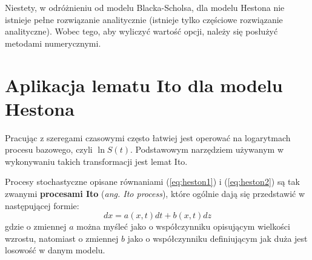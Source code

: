 \documentclass{pracamgr}
\begin{document}
Niestety, w odróżnieniu od modelu Blacka-Scholsa, dla modelu Hestona nie istnieje pełne rozwiązanie 
analitycznie (istnieje tylko częściowe rozwiązanie analityczne). Wobec tego, aby 
wyliczyć wartość opcji, należy się posłużyć metodami numerycznymi.

\section{Aplikacja lematu Ito dla modelu Hestona}

Pracując z szeregami czasowymi często łatwiej jest operować na 
logarytmach procesu bazowego, czyli $\ln S(t)$.
Podstawowym narzędziem używanym w wykonywaniu takich transformacji jest lemat Ito.

Procesy stochastyczne opisane równaniami (\ref{eq:heston1}) i (\ref{eq:heston2}) są tak 
zwanymi \textbf{procesami Ito}
(\textit{ang. Ito process}), które ogólnie dają się przedstawić w 
następującej formie:
\begin{equation}
  dx = a(x,t) dt + b(x,t) dz
\end{equation}
gdzie o zmiennej $a$ można myśleć jako o współczynniku opisującym
wielkości wzrostu, natomiast 
o zmiennej $b$ jako o współczynniku definiującym jak duża jest losowość w danym 
modelu.
\end{document}

